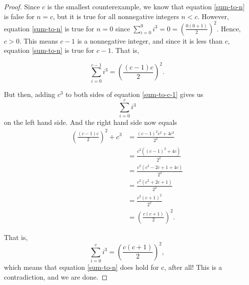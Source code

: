 \documentclass[twoside,12pt]{article}
\begin{document}
\begin{problem}{20}
{\begin{proof}
Since $c$ is the smallest counterexample, we know that equation \eqref{sum-to-n} is false for $n = c$, but it is true for all nonnegative integers $n < c$.  However, equation \eqref{sum-to-n} is true for $n = 0$ since $\sum_{i=0}^{0} i^3 = 0 = \left(\frac{0(0+1)}{2}\right)^2$. Hence, $c > 0$. This means $c - 1$ is a nonnegative integer, and since it is less than $c$, equation \eqref{sum-to-n} is true for $c - 1$. That is,

\begin{equation}\label{sum-to-c-1}
\sum_{i=0}^{c-1} i^3 = \left(\frac{(c-1)c}{2}\right)^2.
\end{equation}

But then, adding $c^3$ to both sides of equation \eqref{sum-to-c-1} gives us
\[
\sum_{i=0}^{c} i^3
\]
on the left hand side. And the right hand side now equals
\begin{align*}
\left(\frac{(c-1)c}{2}\right)^2 + c^3 &= \frac{(c-1)^2c^2+4c^3}{2^2}\\
 &= \frac{c^2\left((c-1)^2+4c \right)}{2^2}\\
&= \frac{c^2\left(c^2-2c+1+4c \right)}{2^2}\\
&= \frac{c^2\left(c^2+2c+1 \right)}{2^2}\\
&= \frac{c^2(c+1)^2}{2^2}\\
&= \left(\frac{c(c+1)}{2}\right)^2.
\end{align*}

That is,
\[
\sum_{i=0}^{c} i^3 = \left(\frac{c(c+1)}{2}\right)^2,
\]
which means that equation \ref{sum-to-n} does hold for c, after all! This is a contradiction, and we are done.

\end{proof}
}



\eparts

\end{problem}
\end{document}
